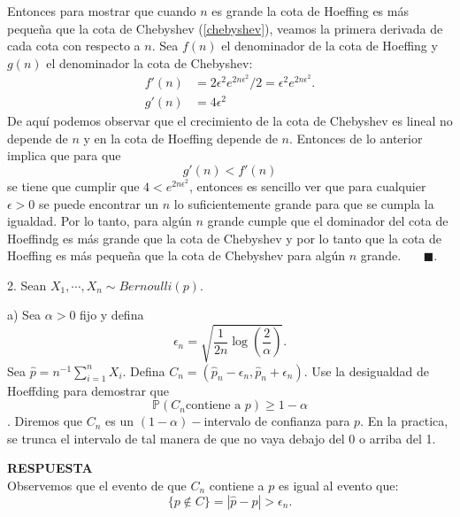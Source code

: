 \documentclass[11pt,letterpaper]{article}
\newcommand{\mP}{\mathbb{P}}
\newcommand{\res}{\textbf{RESPUESTA}\\}
\newcommand{\fin}{$\blacksquare.$}
\begin{document}
Entonces para mostrar que cuando $n$ es grande la cota de Hoeffing es más pequeña que la cota de Chebyshev (\ref{chebyshev}), veamos la primera derivada de cada cota con respecto a $n$. Sea $f(n)$ el denominador de la cota de Hoeffing y $g(n)$ el denominador la cota de Chebyshev:
\begin{align*}
f'(n)&=2\epsilon^2 e^{2n\epsilon^2}/2=\epsilon^2e^{2n\epsilon^2}.\\
g'(n)&=4\epsilon^2
\end{align*} 
De aquí podemos observar que el crecimiento de la cota de Chebyshev es lineal no depende de $n$ y en la cota de Hoeffing depende de $n$. Entonces de lo anterior implica que para que 
$$g'(n)<f'(n)$$
se tiene que cumplir que $4<e^{2n\epsilon^2}$, entonces es sencillo ver que para cualquier $\epsilon>0$ se puede encontrar un $n$ lo suficientemente grande para que se cumpla la igualdad. Por lo tanto, para  algún $n$ grande cumple que el dominador del cota de Hoeffindg es más grande que la cota de Chebyshev y por lo tanto que la cota de Hoeffing es más pequeña que la cota de Chebyshev para algún $n$ grande. \ \ \ \fin 


2. Sean  $X_1,\cdots,X_n\sim Bernoulli(p)$.

a) Sea $\alpha >0 $ fijo y defina 
$$\epsilon_n = \sqrt{\frac{1}{2n} \log\left(\frac{2}{\alpha}\right)}.$$
Sea $\hat{p}=n^{-1}\sum_{i=1}^n X_i.$ Defina $C_n=(\hat{p}_n-\epsilon_n,\hat{p}_n+\epsilon_n)$. Use la desigualdad de Hoeffding para demostrar que $$\mP(C_n \text{contiene a } p)\geq 1-\alpha$$.
Diremos que $C_n$ es un $(1-\alpha)-$intervalo de confianza para $p$. En la practica, se trunca el intervalo de tal manera de que no vaya debajo del 0 o arriba del 1.

\res Observemos que el evento de que $C_n$ contiene a $p$ es igual al evento que:
$$\{p \not \in C\}=|\hat{p}-p|>\epsilon_n.$$
\end{document}

